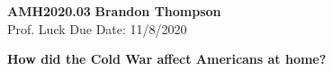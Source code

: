\noindent
\textbf{AMH2020.03} \hfill \textbf{Brandon Thompson} \\
\normalsize Prof. Luck \hfill Due Date: 11/8/2020 \\

\begin{center}
\textbf{How did the Cold War affect Americans at home?}
\end{center}